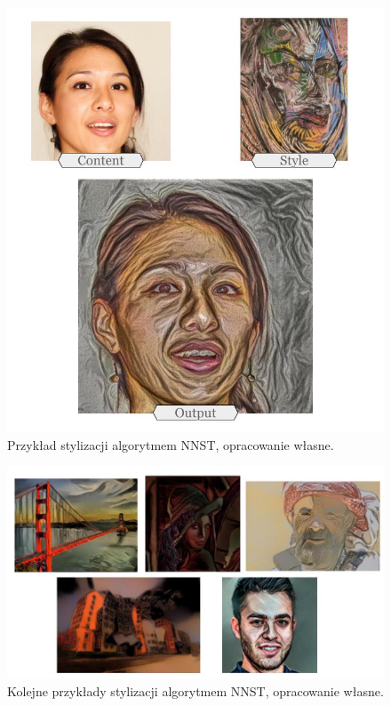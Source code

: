 \documentclass[12pt]{article}
\begin{document}
\begin{figure}[H]
    \centering
    \includegraphics[width=\textwidth]{u28.png}
    \caption{Przykład stylizacji algorytmem NNST, opracowanie własne.}
    \label{fig:18:1}
\end{figure}

\begin{figure}[H]
    \centering
    \includegraphics[width=\textwidth]{u29.png}
    \caption{Kolejne przykłady stylizacji algorytmem NNST, opracowanie własne.}
    \label{fig:18:2}
\end{figure}
\end{document}
